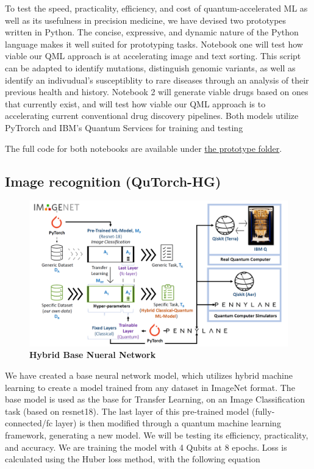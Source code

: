 \documentclass{scrartcl}
\begin{document}
To test the speed, practicality, efficiency, and cost of quantum-accelerated ML as well as its usefulness in precision medicine, we have devised two prototypes written in Python. The concise, expressive, and dynamic nature of the Python language makes it well suited for prototyping tasks. Notebook one will test how viable our QML approach is at accelerating image and text sorting. This script can be adapted to identify mutations, distinguish genomic variants, as well as identify an indivudual's susceptiblity to rare diseases through an analysis of their previous health and history. Notebook 2 will generate viable drugs based on ones that currently exist, and will test how viable our QML approach is to accelerating current conventional drug discovery pipelines. Both models utilize PyTrorch and IBM's Quantum Services for training and testing

The full code for both notebooks are available under \href{prototype/}{the prototype folder}.

\subsection{Image recognition (QuTorch-HG)}
\label{sec:orgeed551a}

\begin{figure}[htbp]
\centering
\includegraphics[width=.9\linewidth]{./assets/imagenet.png}
\caption{\textbf{Hybrid Base Nueral Network}}
\end{figure}

We have created a base neural network model, which utilizes hybrid machine learning to create a model trained from any dataset in ImageNet format. The base model is used as the base for Transfer Learning, on an Image Classification task (based on resnet18). The last layer of this pre-trained model (fully-connected/fc layer) is then modified through a quantum machine learning framework, generating a new model. We will be testing its efficiency, practicality, and accuracy. We are training the model with 4 Qubits at 8 epochs. Loss is calculated using the Huber loss method, with the following equation
\end{document}
